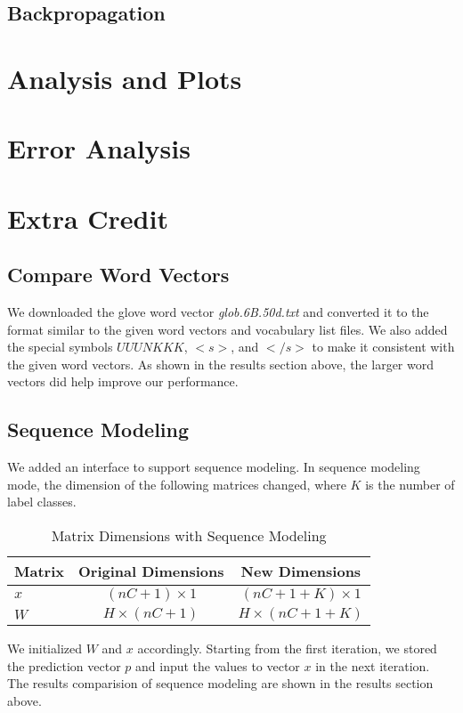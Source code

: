 \documentclass[12pt]{article}
\begin{document}
\subsection{Backpropagation}



\section{Analysis and Plots}



\section{Error Analysis}



\section{Extra Credit}

\subsection{Compare Word Vectors}
We downloaded the glove word vector \textit{glob.6B.50d.txt} and converted it to the format similar to the given word vectors and vocabulary list files. We also added the special symbols $UUUNKKK$, $<s>$, and $</s>$ to make it consistent with the given word vectors. As shown in the results section above, the larger word vectors did help improve our performance.

\subsection{Sequence Modeling}
We added an interface to support sequence modeling. In sequence modeling mode, the dimension of the following matrices changed, where $K$ is the number of label classes.

\begin{table}[H]
	\begin{center}
		\begin{tabular}{|l|c|c|}
			\hline
			Matrix & Original Dimensions & New Dimensions \\\hline
			$x$ & ${(nC+1)}\times{1}$ & ${(nC+1+K)}\times{1}$ \\\hline
			$W$ & ${H}\times{(nC+1)}$ & ${H}\times{(nC+1+K)}$ \\\hline
		\end{tabular}
	\end{center}
	\caption{Matrix Dimensions with Sequence Modeling}
	\label{tab:dim2}
\end{table}

We initialized $W$ and $x$ accordingly. Starting from the first iteration, we stored the prediction vector $p$ and input the values to vector $x$ in the next iteration.\\
The results comparision of sequence modeling are shown in the results section above.
\end{document}

